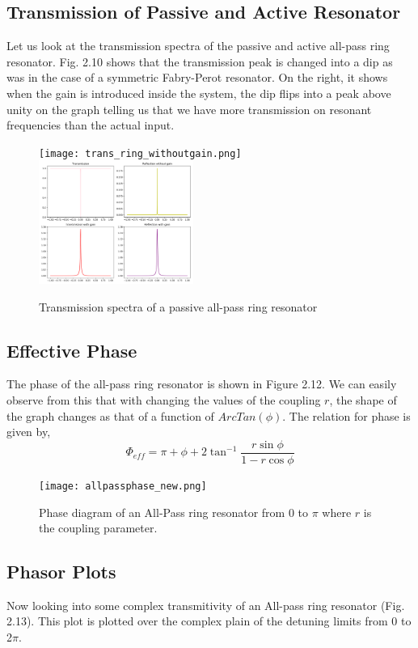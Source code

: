 \subsection{Transmission of Passive and Active Resonator}
Let us look at the transmission spectra of the passive and active all-pass ring resonator. Fig. 2.10 shows that the transmission peak is changed into a dip as was in the case of a symmetric Fabry-Perot resonator. On the right, it shows when the gain is introduced inside the system, the dip flips into a peak above unity on the graph telling us that we have more transmission on resonant frequencies than the actual input.
\begin{figure}[h]
\texttt{[image: trans\_ring\_withoutgain.png]}
\includegraphics[width=0.45\textwidth]{all-pall_gain.png}
\caption{Transmission spectra of a passive all-pass ring resonator}
\end{figure}


\subsection{Effective Phase}
The phase of the all-pass ring resonator is shown in Figure 2.12. We can easily observe from this that with changing the values of the coupling $r$, the shape of the graph changes as that of a function of $ArcTan(\phi)$. The relation for phase is given by,
\begin{equation}
\Phi_{eff} = \pi + \phi + 2\tan^{-1}\frac{r\sin\phi}{1-r\cos\phi}
\end{equation}

\begin{figure}[h]
\centering
\texttt{[image: allpassphase\_new.png]}
\caption{Phase diagram of an All-Pass ring resonator from 0 to $\pi$ where $r$ is the coupling parameter.}
\end{figure}

\subsection{Phasor Plots}
Now looking into some complex transmitivity of an All-pass ring resonator (Fig. 2.13). This plot is plotted over the complex plain of the detuning limits from 0 to 2$\pi$. 

